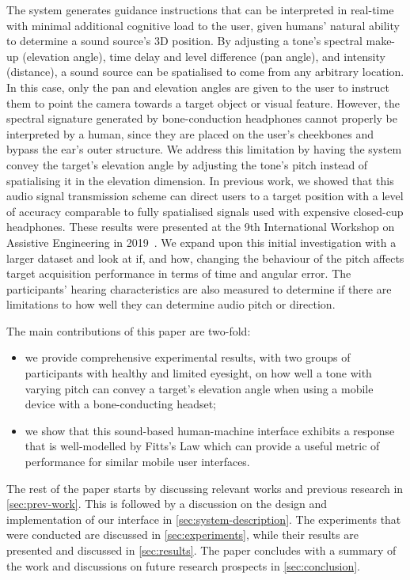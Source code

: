 \documentclass[acmsmall]{acmart}
\begin{document}
The system generates guidance instructions that can be interpreted in real-time with minimal additional cognitive load to the user, given humans' natural ability to determine a sound source's 3D position.
By adjusting a tone's spectral make-up (elevation angle), time delay and level difference (pan angle), and intensity (distance), a sound source can be spatialised to come from any arbitrary location.
In this case, only the pan and elevation angles are given to the user to instruct them to point the camera towards a target object or visual feature.
However, the spectral signature generated by bone-conduction headphones cannot properly be interpreted by a human, since they are placed on the user's cheekbones and bypass the ear's outer structure.
We address this limitation by having the system convey the target's elevation angle by adjusting the tone's pitch instead of spatialising it in the elevation dimension.
In previous work, we showed that this audio signal transmission scheme can direct users to a target position with a level of accuracy comparable to fully spatialised signals used with expensive closed-cup headphones.
These results were presented at the 9th International Workshop on Assistive Engineering in 2019~\citep{lock2019bone}.
We expand upon this initial investigation with a larger dataset and look at if, and how, changing the behaviour of the pitch affects target acquisition performance in terms of time and angular error.
The participants' hearing characteristics are also measured to determine if there are limitations to how well they can determine audio pitch or direction. 

The main contributions of this paper are two-fold: 
\begin{itemize}
  \item we provide comprehensive experimental results, with two groups of participants with healthy and limited eyesight, on how well a tone with varying pitch can convey a target's elevation angle when using a mobile device with a bone-conducting headset; 
  \item we show that this sound-based human-machine interface exhibits a response that is well-modelled by Fitts's Law which can provide a useful metric of performance for similar mobile user interfaces.
\end{itemize}

The rest of the paper starts by discussing relevant works and previous research in \cref{sec:prev-work}.
This is followed by a discussion on the design and implementation of our interface in \cref{sec:system-description}.
The experiments that were conducted are discussed in \cref{sec:experiments}, while their results are presented and discussed in \cref{sec:results}.
The paper concludes with a summary of the work and discussions on future research prospects in \cref{sec:conclusion}.
\end{document}
